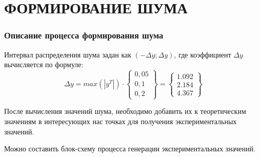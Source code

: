 \part{ФОРМИРОВАНИЕ ШУМА}
    \setcounter{section}{0}
    \section{Описание процесса формирования шума}
        Интервал распределения шума задан как $ (-\Delta y; \Delta y) $, где коэффициент $\Delta y$ вычисляется по формуле:
        $$
            \Delta y = max(|y^{T}|) \cdot
            \begin{Bmatrix}
                0,05 \\
                0,1 \\
                0,2
            \end{Bmatrix}
            =
            \begin{Bmatrix}
                1.092 \\
                2.184 \\
                4.367
            \end{Bmatrix}
        $$

        После вычисления значений шума, необходимо добавить их к теоретическим значениям в интересующих нас точках для получения экспериментальных значений.

        Можно составить блок-схему процесса генерации экспериментальных значений.

